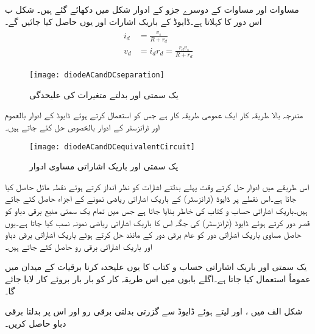مساوات   اور مساوات   کے دوسرے جزو کے ادوار شکل    میں دکھائے گئے ہیں۔
شکل  ب اس دور کا  کہلاتا ہے۔ڈایوڈ کے باریک اشارات  اور  یوں حاصل کیا جائیں گے۔
\begin{gather}
\begin{aligned}
i_d&=\frac{v_s}{R+r_d}\\
v_d&=i_d r_d=\frac{r_d v_s}{R+r_d}
\end{aligned}
\end{gather}
%
\begin{figure}
\centering
\texttt{[image: diodeACandDCseparation]}
\caption{یک سمتی اور بدلتے متغیرات کی علیحدگی}
\label{شکل_یک_سمتی_بدلتے_متغیرات_کی_علیحدگی}
\end{figure}
مندرجہ بالا طریقہ کار ایک عمومی طریقہ کار ہے جس کو استعمال کرتے ہوئے ڈایوڈ کے ادوار بالعموم اور ٹرانزسٹر کے ادوار بالخصوص حل کئے جاتے ہیں۔
\begin{figure}
\centering
\texttt{[image: diodeACandDCequivalentCircuit]}
\caption{یک سمتی اور باریک اشاراتی مساوی ادوار}
\label{شکل_یک_سمتی_اور_باریک_اشاراتی_مساوی_ادوار}
\end{figure}
اس طریقے میں ادوار حل کرتے وقت پہلے بدلتے اشارات کو نظر انداز کرتے ہوئے نقطہ مائل حاصل کیا جاتا ہے۔اس نقطے پر ڈایوڈ (ٹرانزسٹر) کے باریک اشاراتی ریاضی نمونے کے اجزاء حاصل کئے جاتے ہیں۔باریک اشاراتی حساب و کتاب کی خاطر  بنایا جاتا ہے جس میں تمام یک سمتی منبع برقی دباو کو قصر دور کرتے ہوئے ڈایوڈ (ٹرانزسٹر)  کی جگہ اس کا باریک اشاراتی ریاضی نمونہ نسب کیا جاتا ہے۔یوں حاصل مساوی باریک اشاراتی دور کو عام برقی دور کے مانند حل کرتے ہوئے باریک اشاراتی برقی دباو اور باریک اشاراتی برقی رو حاصل کئے جاتے ہیں۔

یک سمتی اور باریک اشاراتی حساب و کتاب کا یوں علیحدہ کرنا برقیات کے میدان میں عموماً استعمال کیا جاتا ہے۔اگلے بابوں میں اس طریقہ کار کو بار بار بروئے کار لایا جائے گا۔

شکل  الف میں  ،   اور  لیتے ہوئے ڈایوڈ سے گزرتی بدلتی برقی رو    اور اس پر بدلتا برقی دباو  حاصل کریں۔

